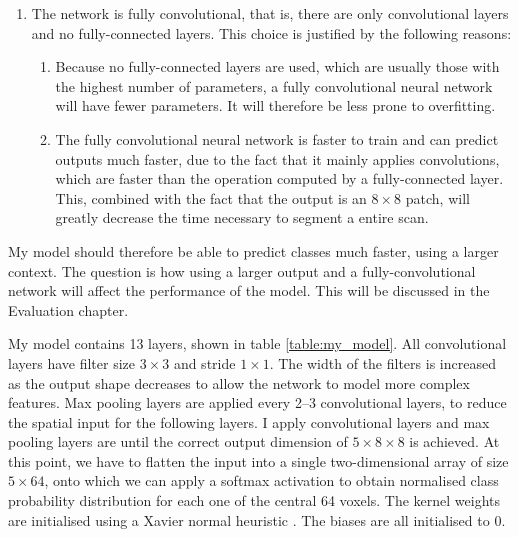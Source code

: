 \documentclass[12pt,a4paper,twoside,openright]{report}
\begin{document}
\begin{enumerate}
	\item The network is fully convolutional, that is, there are only convolutional layers and no fully-connected layers. This choice is justified by the following reasons:
	\begin{enumerate}
		\item Because no fully-connected layers are used, which are usually those with the highest number of parameters, a fully convolutional neural network will have fewer parameters. It will therefore be less prone to overfitting.
		\item The fully convolutional neural network is faster to train and can predict outputs much faster, due to the fact that it mainly applies convolutions, which are faster than the operation computed by a fully-connected layer. This, combined with the fact that the output is an $8 \times 8$ patch, will greatly decrease the time necessary to segment a entire scan.
	\end{enumerate}
\end{enumerate}

My model should therefore be able to predict classes much faster, using a larger context. The question is how using a larger output and a fully-convolutional network will affect the performance of the model. This will be discussed in the Evaluation chapter.

My model contains 13 layers, shown in table \ref{table:my_model}. All convolutional layers have filter size $3 \times 3$ and stride $1 \times 1$. The width of the filters is increased as the output shape decreases to allow the network to model more complex features. Max pooling layers are applied every 2--3 convolutional layers, to reduce the spatial input for the following layers. I apply convolutional layers and max pooling layers are until the correct output dimension of $5 \times 8 \times 8$ is achieved. At this point, we have to flatten the input into a single two-dimensional array of size $5 \times 64$, onto which we can apply a softmax activation to obtain normalised class probability distribution for each one of the central 64 voxels. The kernel weights are initialised using a Xavier normal heuristic \cite{xavier_init}. The biases are all initialised to 0.
\end{document}
